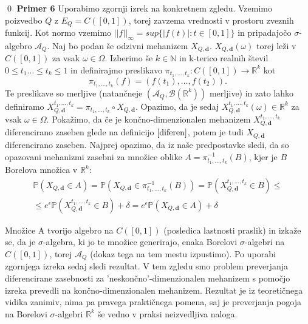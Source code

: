 \documentclass[mat1]{article}
\theoremstyle{definition}
\begin{document}
\newline 
\qed
\newline
\newline
\textbf{Primer 6} Uporabimo zgornji izrek na konkretnem zgledu. Vzemimo poizvedbo $Q$ z $E_Q = C([0,1])$, torej zavzema vrednosti v prostoru zveznih funkcij. Kot normo vzemimo $||f||_\infty = sup\{|f(t)| : t \in [0,1]\}$ in pripadajočo $\sigma$-algebro $\mathcal{A}_Q$. Naj bo podan še odzivni mehanizem $X_{Q,\textbf{d}}$. $X_{Q,\textbf{d}}(\omega)$ torej leži v $C([0,1])$ za vsak $\omega \in \Omega$.
\newline
Izberimo še $k \in \mathbb{N}$ in k-terico realnih števil $0 \leq t_1 \ldots \leq t_k \leq 1$ in definirajmo preslikavo $ \pi _{t_1,\ldots,t_k}: C([0,1]) \rightarrow \mathbb{R}^k$ kot $$\pi _{t_1,\ldots,t_k}(f) = (f(t_1),\ldots,f(t_2)).$$ Te preslikave so merljive (natančneje $(\mathcal{A}_Q, \mathcal{B}(\mathbb{R}^k))$ merljive) in zato lahko definiramo $X_{Q,\textbf{d}}^{t_1,\ldots,t_k} = \pi _{t_1,\ldots,t_k} \circ X_{Q,\textbf{d}}$. Opazimo, da je sedaj $X_{Q,\textbf{d}}^{t_1,\ldots,t_k} (\omega) \in \mathbb{R}^k$ za vsak $\omega \in \Omega$. Pokažimo, da če je končno-dimenzionalen mehanizem $X_{Q,\textbf{d}}^{t_1,\ldots,t_k}$ diferencirano zaseben glede na definicijo $\eqref{diferen}$, potem je tudi $X_{Q,\textbf{d}}$ diferencirano zaseben. Najprej opazimo, da iz naše predpostavke sledi, da so opazovani mehanizmi zasebni za množice oblike $A = \pi _{t_1,\ldots,t_k}^{-1}(B)$, kjer je $B$ Borelova množica v $\mathbb{R}^k$: 
\begin{equation*}
\begin{split}
\mathbb{P}(X_{Q,\textbf{d}} \in A) =  \mathbb{P}(X_{Q,\textbf{d}} \in \pi _{t_1,\ldots,t_k}^{-1}(B)) = \mathbb{P}(X_{Q,\textbf{d}}^{t_1,\ldots,t_k} \in B) \leq \\
 \leq e^{\epsilon}\mathbb{P}(X_{Q,\textbf{d}}^{t_1,\ldots,t_k} \in B) + \delta = e^{\epsilon}\mathbb{P}(X_{Q,\textbf{d}} \in A) + \delta
\end{split}
\end{equation*}


Množice A tvorijo algebro na $C([0,1])$ (posledica lastnosti praslik) in izkaže se, da je $\sigma$-algebra, ki jo te množice generirajo, enaka  Borelovi $\sigma$-algebri na $C([0,1])$, torej $\mathcal{A}_Q$ (dokaz tega na tem mestu izpustimo). Po uporabi zgornjega izreka sedaj sledi rezultat.
\newline
\newline
V tem zgledu smo problem preverjanja diferencirane zasebnosti za 'neskončno'-dimenzionalen mehanizem s pomočjo izreka prevedli na končno-dimenzionalen mehanizem. Rezultat je iz teoretičnega vidika zanimiv, nima pa pravega praktičnega pomena, saj je preverjanja pogoja na Borelovi $\sigma$-algebri $\mathbb{R}^k$ še vedno v praksi neizvedljiva naloga.
\newline
\end{document}
